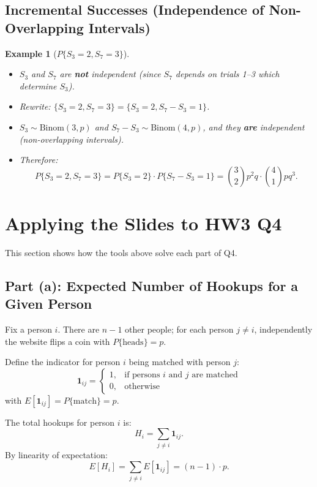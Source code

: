 \documentclass[12pt]{article}
\theoremstyle{definition_style}
\newtheorem{example}[defn]{Example}
\begin{document}
\subsection{Incremental Successes (Independence of Non-Overlapping Intervals)}

\begin{example}[$P\{S_3 = 2, S_7 = 3\}$]
\begin{itemize}
    \item $S_3$ and $S_7$ are \textbf{not} independent (since $S_7$ depends on trials 1--3 which determine $S_3$).
    \item Rewrite: $\{S_3 = 2, S_7 = 3\} = \{S_3 = 2, S_7 - S_3 = 1\}$.
    \item $S_3 \sim \mathrm{Binom}(3, p)$ and $S_7 - S_3 \sim \mathrm{Binom}(4, p)$, and they \textbf{are} independent (non-overlapping intervals).
    \item Therefore:
    \[
        P\{S_3 = 2, S_7 = 3\} = P\{S_3 = 2\} \cdot P\{S_7 - S_3 = 1\} = \binom{3}{2} p^2 q \cdot \binom{4}{1} p q^3.
    \]
\end{itemize}
\end{example}

\newpage
\section{Applying the Slides to HW3 Q4}

This section shows how the tools above solve each part of Q4.

\subsection{Part (a): Expected Number of Hookups for a Given Person}

Fix a person $i$. There are $n-1$ other people; for each person $j \ne i$, independently the website flips a coin with $P\{\text{heads}\} = p$.

Define the indicator for person $i$ being matched with person $j$:
\[
    \mathbf{1}_{ij} = \begin{cases} 1, & \text{if persons } i \text{ and } j \text{ are matched} \\ 0, & \text{otherwise} \end{cases}
\]
with $E[\mathbf{1}_{ij}] = P\{\text{match}\} = p$.

The total hookups for person $i$ is:
\[
    H_i = \sum_{j \ne i} \mathbf{1}_{ij}.
\]
By linearity of expectation:
\[
    \boxed{E[H_i] = \sum_{j \ne i} E[\mathbf{1}_{ij}] = (n-1) \cdot p.}
\]
\end{document}
